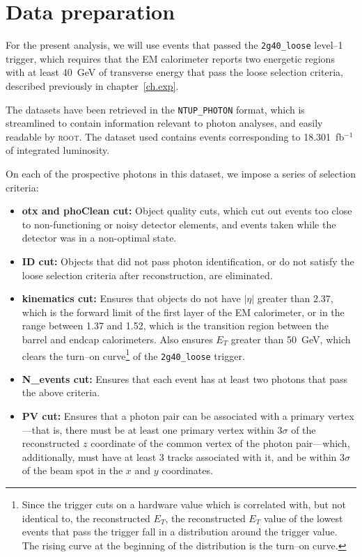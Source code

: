 \chapter{Data preparation \label{ch.data}}

For the present analysis, we will use events that passed the \texttt{2g40\_loose} level--1 trigger, which requires that the EM calorimeter reports two energetic regions with at least 40~GeV of transverse energy that pass the loose selection criteria, described previously in chapter~\ref{ch.exp}.

The datasets have been retrieved in the \texttt{NTUP\_PHOTON} format, which is streamlined to contain information relevant to photon analyses, and easily readable by \textsc{root}. The dataset used contains events corresponding to 18.301~fb$^{-1}$ of integrated luminosity.

On each of the prospective photons in this dataset, we impose a series of selection criteria:

\begin{itemize}
\item \textbf{otx and phoClean cut:} Object quality cuts, which cut out events too close to non-functioning or noisy detector elements, and events taken while the detector was in a non-optimal state.
\item \textbf{ID cut:} Objects that did not pass photon identification, or do not satisfy the loose selection criteria after reconstruction, are eliminated.
\item \textbf{kinematics cut:} Ensures that objects do not have $|\eta|$ greater than 2.37, which is the forward limit of the first layer of the EM calorimeter, or in the range between 1.37 and 1.52, which is the transition region between the barrel and endcap calorimeters. Also ensures $E_T$ greater than 50~GeV, which clears the turn--on curve\footnote{Since the trigger cuts on a hardware value which is correlated with, but not identical to, the reconstructed $E_T$, the reconstructed $E_T$ value of the lowest events that pass the trigger fall in a distribution around the trigger value. The rising curve at the beginning of the distribution is the turn--on curve.} of the \texttt{2g40\_loose} trigger.
\item \textbf{N\_events cut:} Ensures that each event has at least two photons that pass the above criteria.
\item \textbf{PV cut:} Ensures that a photon pair can be associated with a primary vertex---that is, there must be at least one primary vertex within 3$\sigma$ of the reconstructed $z$ coordinate of the common vertex of the photon pair---which, additionally, must have at least 3 tracks associated with it, and be within 3$\sigma$ of the beam spot in the $x$ and $y$ coordinates.

\end{itemize}

